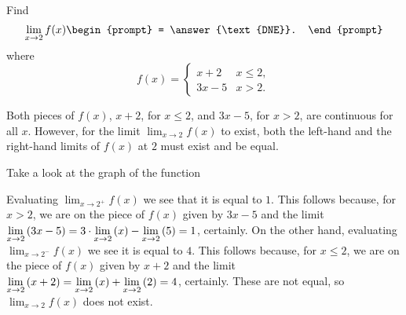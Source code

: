 \documentclass{ximera}
\author{Gregory Hartman \and Matthew Carr}
\begin{document}
\begin{exercise}



  Find 
  \[
  \lim_{x\to 2} f(x)
  \begin{prompt}
  = \answer{\text{DNE}}.
  \end{prompt}
  \]
  where
  \[
  f(x) = \left\{\begin{array}{cl} x+2 & x\leq 2, \\ 3x-5 & x>2. \end{array}\right.
  \]
    \begin{hint}
     Both pieces of $f(x)$, $x+2$, for $x\le2$, and $3x-5$, for $x>2$, are continuous for all $x$. However, for the limit $\lim_{x\to2}f(x)$ to exist, both the left-hand and the right-hand limits of $f(x)$ at $2$ must exist and be equal.
    \end{hint}
     \begin{hint}
    	Take a look at the graph of the function
    \begin{center}
      \end{center} 
    \end{hint}
    \begin{hint}
     Evaluating $\lim_{x\to2^{+}}f(x)$ we see that it is equal to $1$. This follows because, for $x>2$, we are on the piece of $f(x)$ given by $3x-5$ and the limit $\lim_{x\to2}\p{3x-5}=3\cdot\lim_{x\to 2}\p{x}-\lim_{x\to2}\p{5}=1$, certainly. On the other hand, evaluating $\lim_{x\to2^{-}}f(x)$ we see it is equal to $4$. This follows because, for $x\le2$, we are on the piece of $f(x)$ given by $x+2$ and the limit $\lim_{x\to2}\p{x+2}=\lim_{x\to2}\p{x}+\lim_{x\to2}\p{2}=4$, certainly. These are not equal, so $\lim_{x\to 2}f(x)$ does not exist.
    \end{hint} 
\end{exercise}
\end{document}
